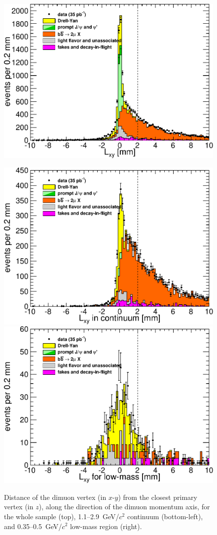 \documentclass[12pt]{cms-tdr}
\begin{document}
\begin{figure}
\begin{center}
\includegraphics[width=0.5\linewidth]{PLOTS/support_lxy_all.pdf}

\vspace{0.35 cm}
\includegraphics[width=0.48\linewidth]{PLOTS/support_lxy_continuum.pdf}
\includegraphics[width=0.48\linewidth]{PLOTS/support_lxy_lowmass.pdf}
\end{center}

\caption{Distance of the dimuon vertex (in $x$-$y$) from the closest
  primary vertex (in $z$), along the direction of the dimuon momentum
  axis, for the whole sample (top), 1.1--2.9~GeV/$c^2$ continuum
  (bottom-left), and 0.35--0.5~GeV/$c^2$ low-mass region
  (right).  \label{fig:support_lxy}}
\end{figure}
\end{document}
